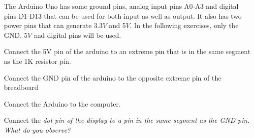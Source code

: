 The Arduino Uno has some ground pins, analog input pins A0-A3 and digital pins D1-D13 that can be used for both input as well as output. It also has two power pins that can generate 3.3$V$ and 5$V$.  In the following exercises, only the GND, 5$V$ and digital pins will be used.
%
%
\begin{problem}
	Connect the 5V pin of the arduino to an  extreme pin that is in the same segment as the 1K resistor pin. 
	\end{problem}	
\begin{problem}
	Connect the GND pin of the arduino to the opposite extreme pin of the breadboard
\end{problem}
\begin{problem}
	Connect the Arduino to the computer.
\end{problem}
\begin{problem}
	Connect the \em{dot} pin of the display to a pin in the same segment as the GND pin.  What do you observe?
\end{problem}
